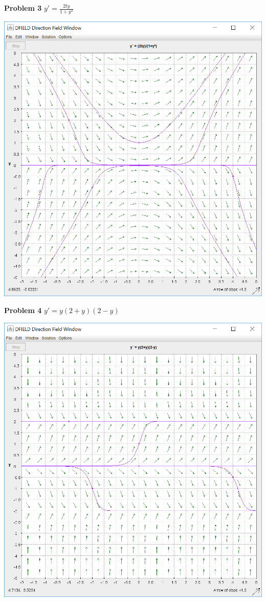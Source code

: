 \documentclass[10pt]{article}
\begin{document}
        {\bf Problem 3} $y'=\frac{2ty}{1+y^2}$
            \begin{center}\includegraphics[scale=0.5]{lab1p3p3.PNG}\end{center}
        {\bf Problem 4} $y'=y(2+y)(2-y)$
            \begin{center}\includegraphics[scale=0.5]{lab1p3p4.PNG}\end{center}
\end{document}
